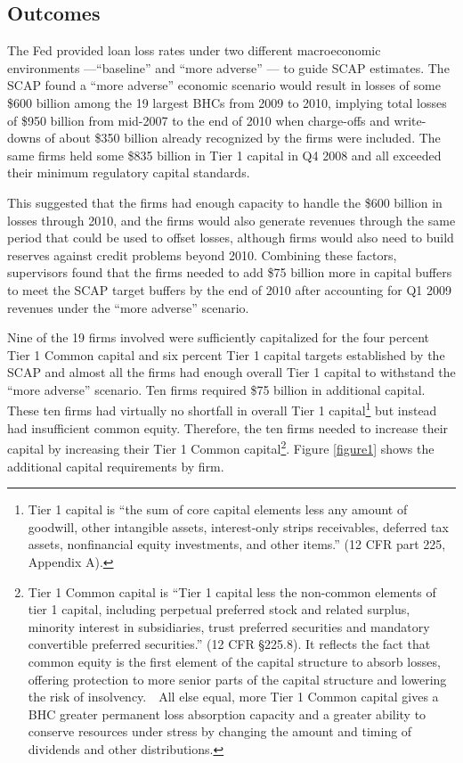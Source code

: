 \documentclass[justified, nobib]{tufte-handout2}
\begin{document}
\subsection{Outcomes}

The Fed provided loan loss rates under two different macroeconomic
environments ---``baseline'' and ``more adverse'' --- to guide SCAP
estimates. The SCAP found a ``more adverse'' economic scenario would result
in losses of some \$600 billion among the 19 largest BHCs from 2009 to
2010, implying total losses of \$950 billion from mid-2007 to the end of
2010 when charge-offs and write-downs of
about \$350 billion already recognized by the firms were included. The same firms held some \$835
billion in Tier 1 capital in Q4 2008 and all exceeded their minimum
regulatory capital standards.\citep{Results}

This suggested that the firms had enough capacity to handle the \$600 billion
in losses through 2010, and the firms would also generate revenues
through the same period that could be used to offset losses, although
firms would also need to build reserves against credit problems beyond
2010. Combining these factors, supervisors found that the firms needed to add
\$75 billion more in capital buffers to meet the SCAP target buffers by
the end of 2010 after accounting for Q1 2009 revenues under the ``more
adverse'' scenario.

Nine of the 19 firms involved were sufficiently capitalized for the four
percent Tier 1 Common capital and six percent Tier 1 capital targets
established by the SCAP and almost all the firms had enough overall Tier
1 capital to withstand the ``more adverse'' scenario. Ten firms required
\$75 billion in additional capital. These ten firms had virtually no
shortfall in overall Tier 1 capital\footnote{Tier 1 capital is ``the sum
  of core capital elements less any amount of goodwill, other intangible
  assets, interest-only strips receivables, deferred tax assets,
  nonfinancial equity investments, and other items.'' (12 CFR part 225,
  Appendix A).} but instead had insufficient common equity. Therefore,
the ten firms needed to increase their capital by increasing their Tier 1
Common capital\footnote{Tier 1 Common capital is ``Tier 1 capital less
  the non-common elements of tier 1 capital, including perpetual
  preferred stock and related surplus, minority interest in
  subsidiaries, trust preferred securities and mandatory convertible
  preferred securities.'' (12 CFR \S 225.8). It reflects the fact that
  common equity is the first element of the capital structure to absorb
  losses, offering protection to more senior parts of the capital
  structure and lowering the risk of insolvency.~~All else equal, more
  Tier 1 Common capital gives a BHC greater permanent loss absorption
  capacity and a greater ability to conserve resources under stress by
  changing the amount and timing of dividends and other distributions.\citep{Results}}. Figure \ref{figure1} shows the additional capital requirements by firm.
\end{document}
